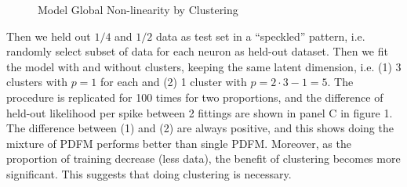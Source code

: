 \documentclass{article}
\begin{document}
	\begin{figure}[h!]
		\centering
		
		\caption{Model Global Non-linearity by Clustering}
	\end{figure}
	
	Then we held out $1/4$ and $1/2$ data as test set in a “speckled” pattern, i.e. randomly select subset of data for each neuron as held-out dataset. Then we fit the model with and without clusters, keeping the same latent dimension, i.e. (1) 3 clusters with $p=1$ for each and (2) 1 cluster with $p=2\cdot 3 - 1 = 5$. The procedure is replicated for 100 times for two proportions, and the difference of held-out likelihood per spike between 2 fittings are shown in panel C in figure 1. The difference between (1) and (2) are always positive, and this shows doing the mixture of PDFM performs better than single PDFM. Moreover, as the proportion of training decrease (less data), the benefit of clustering becomes more significant. This suggests that doing clustering is necessary.
	
\end{document}
